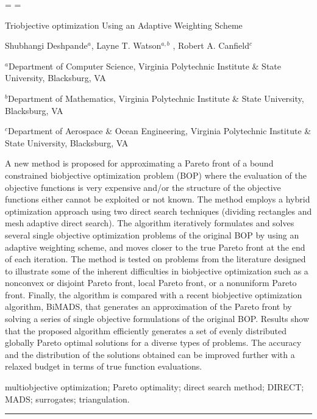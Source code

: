 \rn \AD
\rn \ASZ
\rn \ASZI
\rn \C
\rn \D
\rn \DPAM
\rn \DT
\rn \DWC
\rn \E
\rn \GF
\rn \GSG
\rn \HWRSVJBT
\rn \JPS
\rn \KWT
\rn \RKW
\rn \TZWBIB
\rn \VL
\rn \WCSF
\rn \WIHM

\headline={\hfil}
\footline={\hfil}

\centerline{\bfXIV Triobjective optimization Using an Adaptive Weighting Scheme}
\vskip 1.2pc
\centerline{\rmXII Shubhangi Deshpande{$^a$}, Layne T. Watson{$^{a,b}$
}, Robert A. Canfield$^c$}
\smallskip
\centerline{\rmVIII $^a$Department of Computer Science, Virginia Polytechnic 
Institute \& State University, Blacksburg, VA}
\centerline{\rmVIII $^b$Department of Mathematics, Virginia Polytechnic 
Institute \& State University, Blacksburg, VA}
\centerline{\rmVIII $^c$Department of Aerospace \& Ocean Engineering, Virginia 
Polytechnic Institute \& State University, Blacksburg, VA}
\bigskip

\smallskip
\noindent A new method is proposed for approximating a Pareto front of 
a bound constrained biobjective optimization problem (BOP) where the evaluation 
of the objective functions is very expensive and/or the structure of the 
objective functions either cannot be exploited or not known. The  
method employs a hybrid optimization approach using two direct search 
techniques (dividing rectangles and mesh adaptive direct search). The algorithm  
iteratively formulates and solves several single objective optimization 
problems of the original BOP by using an adaptive weighting scheme, and moves 
closer to the true Pareto front at the end of each iteration. The method is 
tested on problems from the literature designed to illustrate some of the 
inherent difficulties in biobjective optimization such as a nonconvex or 
disjoint Pareto front, local Pareto front, or a nonuniform Pareto front. 
Finally, the algorithm is compared with a recent biobjective optimization 
algorithm, BiMADS, that generates an approximation of the Pareto front by 
solving a series of single objective formulations of the original BOP. 
Results show that the proposed algorithm efficiently generates a set of evenly 
distributed globally Pareto optimal solutions for a diverse types of problems. 
The accuracy and the distribution of the solutions obtained can be improved 
further with a relaxed budget in terms of true function evaluations. 

\bigskip{} multiobjective optimization; Pareto 
optimality; direct search method; DIRECT; MADS; surrogates; triangulation.
\smallskip
\hrule
\smallskip
%
%

